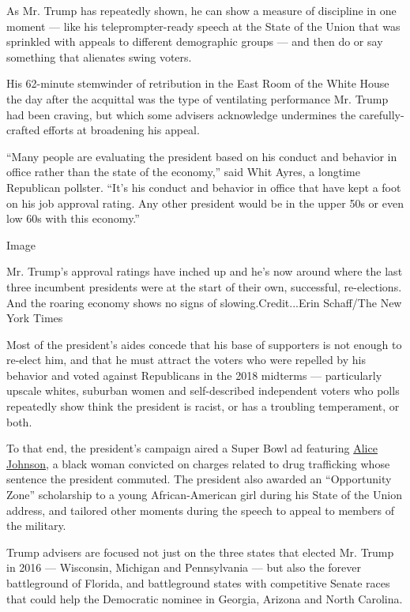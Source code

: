 As Mr. Trump has repeatedly shown, he can show a measure of discipline
in one moment --- like his teleprompter-ready speech at the State of the
Union that was sprinkled with appeals to different demographic groups
--- and then do or say something that alienates swing voters.

His 62-minute stemwinder of retribution in the East Room of the White
House the day after the acquittal was the type of ventilating
performance Mr. Trump had been craving, but which some advisers
acknowledge undermines the carefully-crafted efforts at broadening his
appeal.

``Many people are evaluating the president based on his conduct and
behavior in office rather than the state of the economy,'' said Whit
Ayres, a longtime Republican pollster. ``It's his conduct and behavior
in office that have kept a foot on his job approval rating. Any other
president would be in the upper 50s or even low 60s with this economy.''

Image

Mr. Trump's approval ratings have inched up and he's now around where
the last three incumbent presidents were at the start of their own,
successful, re-elections. And the roaring economy shows no signs of
slowing.Credit...Erin Schaff/The New York Times

Most of the president's aides concede that his base of supporters is not
enough to re-elect him, and that he must attract the voters who were
repelled by his behavior and voted against Republicans in the 2018
midterms --- particularly upscale whites, suburban women and
self-described independent voters who polls repeatedly show think the
president is racist, or has a troubling temperament, or both.

To that end, the president's campaign aired a Super Bowl ad featuring
\href{https://www.nytimes.com/2020/02/06/us/politics/alice-johnson-trump-super-bowl-ad.html}{Alice
Johnson}, a black woman convicted on charges related to drug trafficking
whose sentence the president commuted. The president also awarded an
``Opportunity Zone'' scholarship to a young African-American girl during
his State of the Union address, and tailored other moments during the
speech to appeal to members of the military.

Trump advisers are focused not just on the three states that elected Mr.
Trump in 2016 --- Wisconsin, Michigan and Pennsylvania --- but also the
forever battleground of Florida, and battleground states with
competitive Senate races that could help the Democratic nominee in
Georgia, Arizona and North Carolina.

